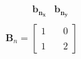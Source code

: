 \documentclass[preview]{standalone}
\begin{document}
\begin{align*}
\begin{array}{c}\begin{matrix}\hspace{1cm} \mathbf{b_{n_x}} & \mathbf{b_{n_y}} \end{matrix} \\  \mathbf{B}_n = \begin{bmatrix} 1 & \quad 0 \\ \\1 & \quad 2 \end{bmatrix} \end{array}
\end{align*}
\end{document}
